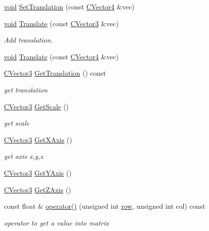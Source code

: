 \begin{DoxyCompactItemize}
\hyperlink{glu_8h_a4292190e3f1f6b373a760c7d9316ad3c}{void} \hyperlink{class_c_matrix44_a95eed7e918c9a0acac1615cc9059908e}{Set\-Translation} (const \hyperlink{class_c_vector4}{C\-Vector4} \&vec)
\item 
\hyperlink{glu_8h_a4292190e3f1f6b373a760c7d9316ad3c}{void} \hyperlink{class_c_matrix44_a7fe9f37064ceb07e41f0d34f14340ba2}{Translate} (const \hyperlink{class_c_vector3}{C\-Vector3} \&vec)
\begin{DoxyCompactList}\small\item\em Add translation. \end{DoxyCompactList}\item 
\hyperlink{glu_8h_a4292190e3f1f6b373a760c7d9316ad3c}{void} \hyperlink{class_c_matrix44_a57162e8484192db5286f7cb03bd065a6}{Translate} (const \hyperlink{class_c_vector4}{C\-Vector4} \&vec)
\item 
\hyperlink{class_c_vector3}{C\-Vector3} \hyperlink{class_c_matrix44_aa849d2b509dd5cc56ec6563822240c84}{Get\-Translation} () const 
\begin{DoxyCompactList}\small\item\em get translation \end{DoxyCompactList}\item 
\hyperlink{class_c_vector3}{C\-Vector3} \hyperlink{class_c_matrix44_aae42214fe24fb05be617b27caac9d66b}{Get\-Scale} ()
\begin{DoxyCompactList}\small\item\em get scale \end{DoxyCompactList}\item 
\hyperlink{class_c_vector3}{C\-Vector3} \hyperlink{class_c_matrix44_a0b8ee58e05352544361280918f2ca235}{Get\-X\-Axis} ()
\begin{DoxyCompactList}\small\item\em get axis x,y,z \end{DoxyCompactList}\item 
\hyperlink{class_c_vector3}{C\-Vector3} \hyperlink{class_c_matrix44_abcb2267e652096e7d83ce98665f1de6a}{Get\-Y\-Axis} ()
\item 
\hyperlink{class_c_vector3}{C\-Vector3} \hyperlink{class_c_matrix44_a8d98f62457193075af83da52c6f8d884}{Get\-Z\-Axis} ()
\item 
const float \& \hyperlink{class_c_matrix44_a895ba1d9a64183cee70eedddce95c8b8}{operator()} (unsigned int \hyperlink{glext_8h_a11b277b422822f784ee248b43eee3e1e}{row}, unsigned int col) const 
\begin{DoxyCompactList}\small\item\em operator to get a value into matrix \end{DoxyCompactList}\item 

\end{DoxyCompactItemize}
